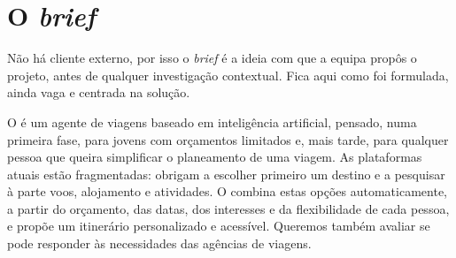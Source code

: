 \section{O \textit{brief}}\label{sec:brief}

Não há cliente externo, por isso o \textit{brief} é a ideia com que a equipa propôs o projeto, antes de qualquer
investigação contextual. Fica aqui como foi formulada, ainda vaga e centrada na solução.

\begin{tcolorbox}[colback=roamly!6,colframe=roamly,arc=2pt,boxrule=0.8pt]
O \projeto{} é um agente de viagens baseado em inteligência artificial, pensado, numa primeira fase, para jovens com
orçamentos limitados e, mais tarde, para qualquer pessoa que queira simplificar o planeamento de uma viagem. As plataformas
atuais estão fragmentadas: obrigam a escolher primeiro um destino e a pesquisar à parte voos, alojamento e atividades.
O \projeto{} combina estas opções automaticamente, a partir do orçamento, das datas, dos interesses e da flexibilidade de
cada pessoa, e propõe um itinerário personalizado e acessível. Queremos também avaliar se pode responder às necessidades
das agências de viagens.
\end{tcolorbox}
